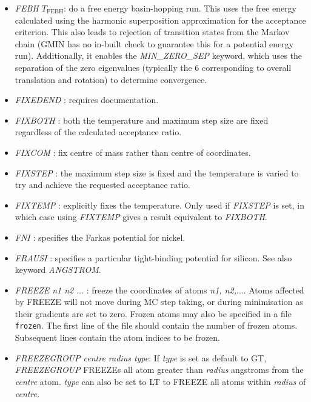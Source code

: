 \documentclass[12pt,a4paper,dvips]{article}
\begin{document}
\begin{itemize}
\item {\it FEBH $T_\text{FEBH}$\/}: do a free energy basin-hopping run. This uses the free energy
calculated using the harmonic superposition approximation for the acceptance criterion. This also
leads to rejection of transition states from the Markov chain (GMIN has no in-built check to guarantee
this for a potential energy run). Additionally, it enables the {\it MIN\_ZERO\_SEP \/} keyword, which 
uses the separation of the zero eigenvalues (typically the 6 corresponding to overall translation and 
rotation) to determine convergence.

\item {\it FIXEDEND \/}: requires documentation.

\item {\it FIXBOTH \/}: both the temperature and maximum step size are fixed regardless of
the calculated acceptance ratio.

\item {\it FIXCOM \/}: fix centre of mass rather than centre of coordinates.

\item {\it FIXSTEP \/}: the maximum step size is fixed and the temperature is varied to
try and achieve the requested acceptance ratio.

\item {\it FIXTEMP \/}: explicitly fixes the temperature. Only used if {\it FIXSTEP\/} is set, in 
which case using {\it FIXTEMP\/} gives a result equivalent to {\it FIXBOTH\/}.

\item {\it FNI \/}: specifies the Farkas potential for nickel.

\item {\it FRAUSI \/}: specifies a particular tight-binding potential for silicon.
See also keyword {\it ANGSTROM\/}.

\item {\it FREEZE n1 n2 $\ldots$ \/}: freeze the coordinates of atoms {\it n1, n2,$\ldots$}. Atoms affected by FREEZE will not move during MC step taking, 
or during minimisation as their gradients are set to zero.
Frozen atoms may also be specified in a file {\tt frozen}. The first line of the file should contain the number of frozen atoms. Subsequent lines contain the atom indices to be frozen.

\item {\it FREEZEGROUP centre radius type\/}: If {\it type} is set as default to {\textrm GT}, {\it FREEZEGROUP\/} FREEZEs all atom greater than {\it radius} angstroms from the {\it centre} atom. {\it type} can also be set to LT to FREEZE all atoms within {\it radius} of {\it centre}.


\end{itemize}
\end{document}
